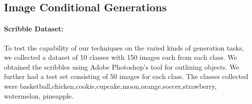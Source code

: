 \subsection{Image Conditional Generations}

\paragraph{Scribble Dataset:}
To test the capability of our techniques on the varied kinds of generation tasks, we collected a dataset of 10 classes with 150 images each from each class. We obtained the scribbles using Adobe Photoshop's tool for outlining objects. We further had a test set consisting of 50 images for each class. The classes collected were basketball,chicken,cookie,cupcake,moon,orange,soccer,strawberry, watermelon, pineapple. 

\newcommand{\addSubFigTenth}[3]{\begin{subfigure}[t]{.16\linewidth}
   \texttt{[image: \#1]}
   \caption{#2}\label{#3}\end{subfigure}
}






